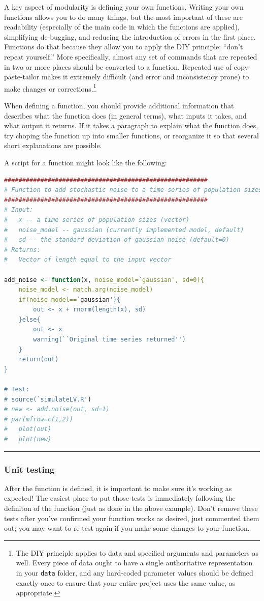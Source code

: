 \documentclass[12pt,letterpaper]{article}
\begin{document}
A key aspect of modularity is defining your own functions.
Writing your own functions allows you to do many things, but the most important of these are readability (especially of the main code in which the functions are applied), simplifying de-bugging, and reducing the introduction of errors in the first place.
Functions do that because they allow you to apply the DIY principle: ``don't repeat yourself.''
More specifically, almost any set of commands that are repeated in two or more places should be converted to a function.
Repeated use of copy-paste-tailor makes it extremely difficult (and error and inconsistency prone) to make changes or corrections.\footnote{The DIY principle applies to data and specified arguments and parameters as well.  Every piece of data ought to have a single authoritative representation in your \texttt{data} folder, and any hard-coded parameter values should be defined exactly once to ensure that your entire project uses the same value, as appropriate.}


When defining a function, you should provide additional information that describes what the function does (in general terms), what inputs it takes, and what output it returns.
If it takes a paragraph to explain what the function does, try choping the function up into smaller functions, or reorganize it so that several short explanations are possible.

A script for a function might look like the following:

\begin{lstlisting}[language=R]
########################################################
# Function to add stochastic noise to a time-series of population sizes.
########################################################
# Input:
#	x -- a time series of population sizes (vector)
#	noise_model -- gaussian (currently implemented model, default)
# 	sd -- the standard deviation of gaussian noise (default=0)
# Returns:
#	Vector of length equal to the input vector

add_noise <- function(x, noise_model=`gaussian', sd=0){
	noise_model <- match.arg(noise_model)
	if(noise_model==`gaussian'){
		out <- x + rnorm(length(x), sd)
	}else{
		out <- x
		warning(``Original time series returned'')
	}
	return(out)
}

# Test:
# source(`simulateLV.R')
# new <- add.noise(out, sd=1)
# par(mfrow=c(1,2))
#	plot(out)
#	plot(new)
\end{lstlisting}
\noindent\rule{12cm}{0.4pt}

\subsubsection{Unit testing}
After the function is defined, it is important to make sure it's working as expected!
The easiest place to put those tests is immediately following the definiton of the function (just as done in the above example).
Don't remove these tests after you've confirmed your function works as desired, just commented them out;
you may want to re-test again if you make some changes to your function.
\end{document}
